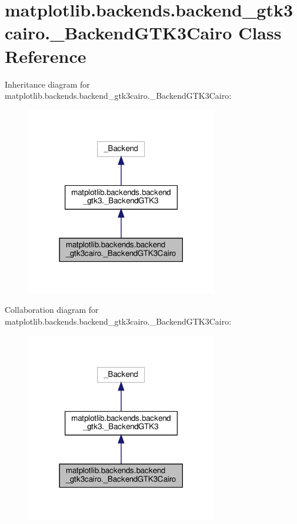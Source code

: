 \hypertarget{classmatplotlib_1_1backends_1_1backend__gtk3cairo_1_1__BackendGTK3Cairo}{}\section{matplotlib.\+backends.\+backend\+\_\+gtk3cairo.\+\_\+\+Backend\+G\+T\+K3\+Cairo Class Reference}
\label{classmatplotlib_1_1backends_1_1backend__gtk3cairo_1_1__BackendGTK3Cairo}


Inheritance diagram for matplotlib.\+backends.\+backend\+\_\+gtk3cairo.\+\_\+\+Backend\+G\+T\+K3\+Cairo\+:
\nopagebreak
\begin{figure}[H]
\begin{center}
\leavevmode
\includegraphics[width=237pt]{classmatplotlib_1_1backends_1_1backend__gtk3cairo_1_1__BackendGTK3Cairo__inherit__graph}
\end{center}
\end{figure}


Collaboration diagram for matplotlib.\+backends.\+backend\+\_\+gtk3cairo.\+\_\+\+Backend\+G\+T\+K3\+Cairo\+:
\nopagebreak
\begin{figure}[H]
\begin{center}
\leavevmode
\includegraphics[width=237pt]{classmatplotlib_1_1backends_1_1backend__gtk3cairo_1_1__BackendGTK3Cairo__coll__graph}
\end{center}
\end{figure}
